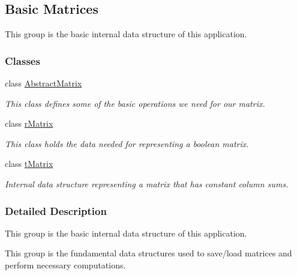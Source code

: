 \hypertarget{group__matrix}{\subsection{Basic Matrices}
\label{group__matrix}
}


This group is the basic internal data structure of this application.  


\subsubsection*{Classes}
\begin{DoxyCompactItemize}
\item 
class \hyperlink{class_abstract_matrix}{Abstract\+Matrix}
\begin{DoxyCompactList}\small\item\em This class defines some of the basic operations we need for our matrix. \end{DoxyCompactList}\item 
class \hyperlink{classr_matrix}{r\+Matrix}
\begin{DoxyCompactList}\small\item\em This class holds the data needed for representing a boolean matrix. \end{DoxyCompactList}\item 
class \hyperlink{classt_matrix}{t\+Matrix}
\begin{DoxyCompactList}\small\item\em Internal data structure representing a matrix that has constant column sums. \end{DoxyCompactList}\end{DoxyCompactItemize}


\subsubsection{Detailed Description}
This group is the basic internal data structure of this application. 

This group is the fundamental data structures used to save/load matrices and perform necessary computations. 